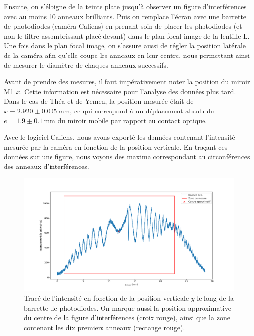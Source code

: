 \documentclass{article}
\begin{document}



Ensuite, on s'éloigne de la teinte plate jusqu'à observer un figure d'interférences avec au moins 10 anneaux brilliants.
Puis on remplace l'écran avec une barrette de photodiodes (caméra Caliens) en prenant soin de placer 
les photodiodes (et non le filtre assombrissant placé devant) dans le plan focal image de la lentille L. Une fois dans le plan focal image, 
on s'assure aussi de régler la position latérale de la caméra afin qu'elle coupe les anneaux en leur centre, 
nous permettant ainsi de mesurer le diamètre de chaques anneaux successifs. 

Avant de prendre des mesures, il faut impérativement noter la position du miroir M1 $x$. Cette information est nécessaire 
pour l'analyse des données plus tard. Dans le cas de Théa et de Yemen, la position mesurée était de $x=2.920 \pm 0.005 \,\textrm{mm}$, ce qui correspond à un déplacement absolu de 
$e = 1.9 \pm 0.1 \,\textrm{mm}$ du miroir mobile par rapport au contact optique.

Avec le logiciel Caliens, nous avons exporté les données contenant l'intensité mesurée par la caméra en fonction de la position verticale. En traçant ces données sur une figure, nous voyons des maxima correspondant au circonférences des anneaux d'interférences.

\begin{figure}[H]
    \centering
    \includegraphics[width=0.8\linewidth]{figs/intensity_plt2.png}
    \caption{Tracé de l'intensité en fonction de la position verticale $y$ le long de la barrette de photodiodes. 
    On marque aussi la position approximative du centre de la figure d'interférences (croix rouge), 
    ainsi que la zone contenant les dix premiers anneaux (rectange rouge).}
    \label{fig:diff_1}
\end{figure}
\end{document}
